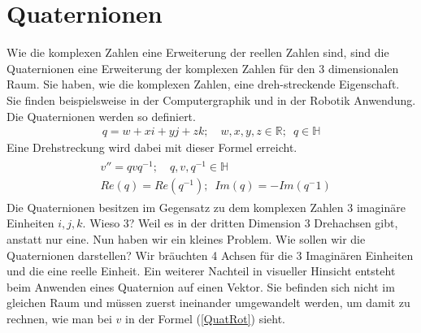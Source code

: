 %
%
%
\section{Quaternionen}
Wie die komplexen Zahlen eine Erweiterung der reellen Zahlen sind, sind die Quaternionen eine Erweiterung der komplexen Zahlen für den 3 dimensionalen Raum. Sie haben, wie die komplexen Zahlen, eine dreh-streckende Eigenschaft.
Sie finden beispielsweise in der Computergraphik und in der Robotik Anwendung.
Die Quaternionen werden so definiert.
\begin{align}
	q = w + xi + yj + zk; \quad w,x,y,z \in \mathbb{R};\enspace q \in \mathbb{H}
\end{align}
Eine Drehstreckung wird dabei mit dieser Formel erreicht. 
\begin{align} \label{QuatRot}
	\begin{split} 
		&v'' = qvq^{-1};\quad q,v,q^{-1} \in \mathbb{H}\\
		&Re(q) = Re(q^{-1});\enspace Im(q) = -Im(q^-1)
	\end{split}
\end{align}
Die Quaternionen besitzen im Gegensatz zu dem komplexen Zahlen 3 imaginäre Einheiten $i,j,k$. Wieso 3? Weil es in der dritten Dimension 3 Drehachsen gibt, anstatt nur eine. Nun haben wir ein kleines Problem. Wie sollen wir die Quaternionen darstellen? Wir bräuchten 4 Achsen für die 3 Imaginären Einheiten und die eine reelle Einheit. Ein weiterer Nachteil in visueller Hinsicht entsteht beim Anwenden eines Quaternion auf einen Vektor. Sie befinden sich nicht im gleichen Raum und müssen zuerst ineinander umgewandelt werden, um damit zu rechnen, wie man bei $v$ in der Formel (\ref{QuatRot}) sieht.


